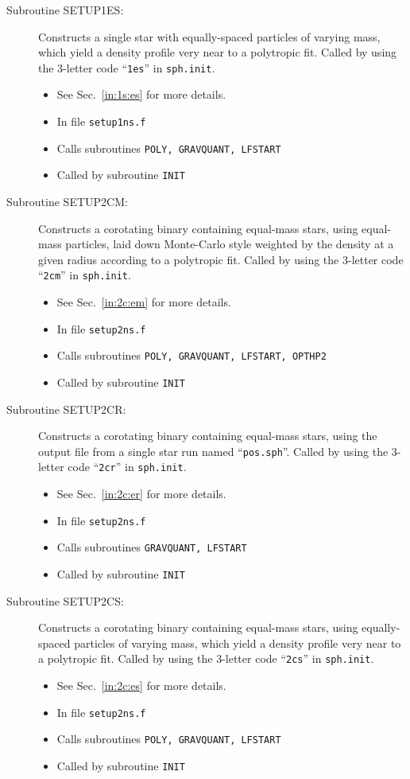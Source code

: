 \begin{description}
\item[Subroutine SETUP1ES:] Constructs a single star with equally-spaced
particles of varying mass, which yield a density profile very near to
a polytropic fit.  Called by using the
3-letter code ``{\tt 1es}'' in {\tt sph.init}. 
\begin{itemize} 
\item See Sec.~\ref{in:1s:es} for more details.
\item In file {\tt setup1ns.f}
\item Calls subroutines {\tt POLY, GRAVQUANT, LFSTART}
\item Called by subroutine {\tt INIT}
\end{itemize}

\item[Subroutine SETUP2CM:] Constructs a corotating binary containing
equal-mass stars, using equal-mass
particles, laid down Monte-Carlo style weighted by the density at a
given radius according to a polytropic fit.  Called by using the
3-letter code ``{\tt 2cm}'' in {\tt sph.init}. 
\begin{itemize} 
\item See Sec.~\ref{in:2c:em} for more details.
\item In file {\tt setup2ns.f}
\item Calls subroutines {\tt POLY, GRAVQUANT, LFSTART, OPTHP2}
\item Called by subroutine {\tt INIT}
\end{itemize}

\item[Subroutine SETUP2CR:] Constructs a corotating binary containing
equal-mass stars, using the output file from a single star run named
``{\tt pos.sph}''.  Called by using the
3-letter code ``{\tt 2cr}'' in {\tt sph.init}. 
\begin{itemize} 
\item See Sec.~\ref{in:2c:er} for more details.
\item In file {\tt setup2ns.f}
\item Calls subroutines {\tt GRAVQUANT, LFSTART}
\item Called by subroutine {\tt INIT}
\end{itemize}

\item[Subroutine SETUP2CS:] Constructs a corotating binary containing
equal-mass stars, using equally-spaced
particles of varying mass, which yield a density profile very near to
a polytropic fit.  Called by using the
3-letter code ``{\tt 2cs}'' in {\tt sph.init}. 
\begin{itemize} 
\item See Sec.~\ref{in:2c:es} for more details.
\item In file {\tt setup2ns.f}
\item Calls subroutines {\tt POLY, GRAVQUANT, LFSTART}
\item Called by subroutine {\tt INIT}
\end{itemize}


\end{description}
